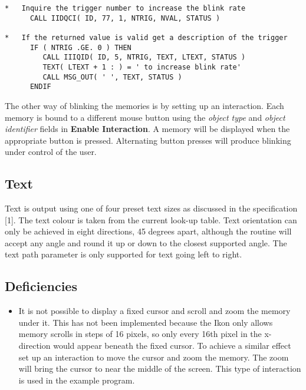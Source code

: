 \begin{small}
\begin{verbatim}
*   Inquire the trigger number to increase the blink rate
      CALL IIDQCI( ID, 77, 1, NTRIG, NVAL, STATUS )

*   If the returned value is valid get a description of the trigger
      IF ( NTRIG .GE. 0 ) THEN
         CALL IIIQID( ID, 5, NTRIG, TEXT, LTEXT, STATUS )
         TEXT( LTEXT + 1 : ) = ' to increase blink rate'
         CALL MSG_OUT( ' ', TEXT, STATUS )
      ENDIF
\end{verbatim}
\end{small}

The other way of blinking the memories is by setting up an interaction.
Each memory is bound to a different
mouse button using the {\it object type} and {\it object identifier}
fields in {\bf Enable Interaction}. A memory will be displayed
when the appropriate button is pressed. Alternating button presses will
produce blinking under control of the user.

\subsection{Text}

Text is output using one of four preset text sizes as discussed in the
specification [1]. The text colour is taken from the current look-up
table. Text orientation can only be achieved in eight directions, 45
degrees apart, although the routine will accept any angle and round
it up or down to the closest supported angle. The text path parameter
is only supported for text going left to right.

\subsection{Deficiencies}

\begin{itemize}
\item
It is not possible to display a fixed cursor and scroll and zoom the
memory under it. This has not been implemented because the Ikon only
allows memory scrolls in steps of 16 pixels, so only every 16th pixel
in the x-direction would appear beneath the fixed cursor. To achieve
a similar effect set up an interaction to move the cursor and zoom
the memory. The zoom will bring the cursor to near the middle of the
screen. This type of interaction is used in the example program.
\end{itemize}

